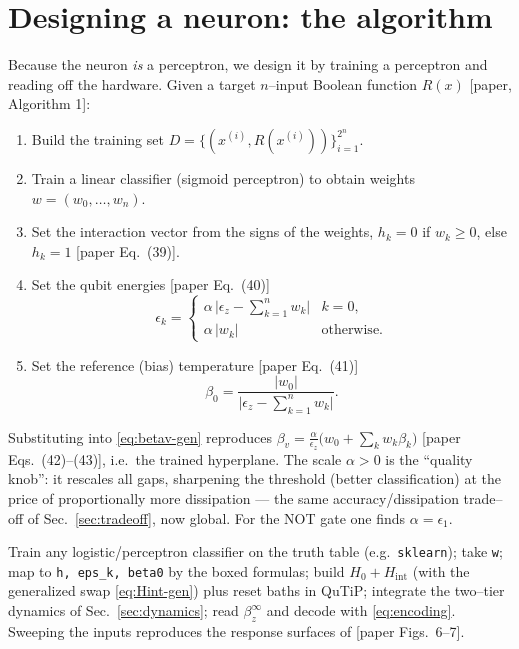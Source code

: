 \documentclass[11pt,a4paper]{article}
\theoremstyle{definition}
\theoremstyle{remark}
\begin{document}
\section{Designing a neuron: the algorithm}
\label{sec:algorithm}
Because the neuron \emph{is} a perceptron, we design it by training a
perceptron and reading off the hardware. Given a target $n$--input
Boolean function $R(x)$ [paper, Algorithm 1]:
\begin{enumerate}[leftmargin=*]
\item Build the training set $D=\{(x^{(i)},R(x^{(i)}))\}_{i=1}^{2^n}$.
\item Train a linear classifier (sigmoid perceptron) to obtain weights
$w=(w_0,\dots,w_n)$.
\item Set the interaction vector from the signs of the weights,
$h_k = 0$ if $w_k\ge0$, else $h_k=1$ [paper Eq.~(39)].
\item Set the qubit energies [paper Eq.~(40)]
\begin{equation}
\epsilon_k=\begin{cases}
\alpha\,\big|\epsilon_z-\sum_{k=1}^n w_k\big| & k=0,\\[2pt]
\alpha\,|w_k| & \text{otherwise.}
\end{cases}
\end{equation}
\item Set the reference (bias) temperature [paper Eq.~(41)]
\begin{equation}
\beta_0=\frac{|w_0|}{\big|\epsilon_z-\sum_{k=1}^n w_k\big|}.
\end{equation}
\end{enumerate}
Substituting into \eqref{eq:betav-gen} reproduces
$\beta_v=\tfrac{\alpha}{\epsilon_z}\big(w_0+\sum_k w_k\beta_k\big)$
[paper Eqs.~(42)--(43)], i.e.\ the trained hyperplane. The scale
$\alpha>0$ is the ``quality knob'': it rescales all gaps, sharpening the
threshold (better classification) at the price of proportionally more
dissipation --- the same accuracy/dissipation trade--off of
Sec.~\ref{sec:tradeoff}, now global. For the NOT gate one finds
$\alpha=\epsilon_1$.

\begin{implbox}
Train any logistic/perceptron classifier on the truth table (e.g.\
\texttt{sklearn}); take \texttt{w}; map to \texttt{h, eps\_k, beta0} by
the boxed formulas; build $H_0+H_{\mathrm{int}}$ (with the generalized
swap \eqref{eq:Hint-gen}) plus reset baths in QuTiP; integrate the
two--tier dynamics of Sec.~\ref{sec:dynamics}; read $\beta_z^\infty$ and
decode with \eqref{eq:encoding}. Sweeping the inputs reproduces the
response surfaces of [paper Figs.~6--7].
\end{implbox}
\end{document}
